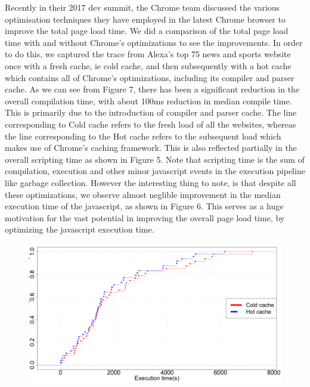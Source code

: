 Recently in their 2017 dev summit, the Chrome team discussed the various optimisation techniques
they have employed in the latest Chrome browser to improve the total page load time.
We did a comparison of the total page load time with and without Chrome's optimizations to see
the improvements. In order to do this, we captured the trace from Alexa's top 75 
news and sports website once with a fresh cache, ie cold cache, and then subsequently with a hot
cache which contains all of Chrome's optimizations, including its compiler and parser cache. 
As we can see from Figure 7, there has been a significant reduction in the overall compilation
time, with about 100ms reduction in median compile time. This is primarily due to the introduction of compiler and parser cache. 
The line corresponding to Cold cache refers to the fresh load of all the websites,
whereas the line corresponding to the Hot cache refers to the subsequent load
which makes use of Chrome's caching framework. 
This is also reflected partially in the overall scripting time
as shown in Figure 5. Note that scripting time is the sum of compilation, execution and other
minor javascript events in the execution pipeline like garbage collection. 
However the interesting thing to note, is that despite all these optimizations,
we observe almost neglible improvement in the median execution time of the javascript, as
shown in Figure 6. This serves as a huge motivation for the vast potential in
improving the overall page load time, by optimizing the javascript execution
time.

\begin{figure}[t]
\centering
\includegraphics[width=0.9\columnwidth]{figs/chrome_exec.png}
\label{fig:compile_p2}
\end{figure}

